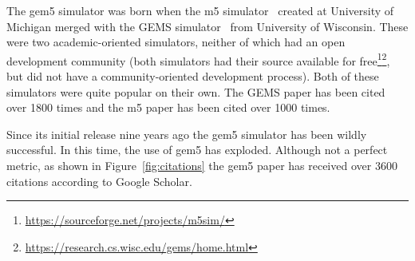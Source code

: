 The gem5 simulator was born when the m5 simulator~\cite{BinkertDHLSR06} created at University of Michigan merged with the GEMS simulator~\cite{MartinSBMXAMHW05} from University of Wisconsin.
These were two academic-oriented simulators, neither of which had an open development community (both simulators had their source available for free\footnote{\url{https://sourceforge.net/projects/m5sim/}}\footnote{\url{https://research.cs.wisc.edu/gems/home.html}}, but did not have a community-oriented development process).
Both of these simulators were quite popular on their own.
The GEMS paper has been cited over 1800 times and the m5 paper has been cited over 1000 times.

Since its initial release nine years ago the gem5 simulator has been wildly successful.
In this time, the use of gem5 has exploded.
Although not a perfect metric, as shown in Figure~\ref{fig:citations} the gem5 paper has received over 3600 citations according to Google Scholar.

